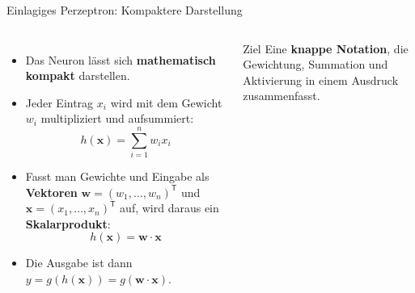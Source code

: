 \begin{frame}{Einlagiges Perzeptron: Kompaktere Darstellung}
    \small
\begin{columns}
\begin{itemize}
  \item Das Neuron lässt sich \textbf{mathematisch kompakt} darstellen.
  \item Jeder Eintrag $x_i$ wird mit dem Gewicht $w_i$ multipliziert und
        aufsummiert:
        \[
          h(\mathbf{x}) = \sum_{i=1}^{n} w_i x_i
        \]
  \item Fasst man Gewichte und Eingabe als \textbf{Vektoren}
        $\mathbf{w} = (w_1, \dots, w_n)^{\mathsf{T}}$ und
        $\mathbf{x} = (x_1, \dots, x_n)^{\mathsf{T}}$ auf, wird daraus ein
        \textbf{Skalarprodukt}:
        \[
          h(\mathbf{x}) = \mathbf{w}\cdot\mathbf{x}
        \]
  \item Die Ausgabe ist dann $y = g(h(\mathbf{x})) = g(\mathbf{w}\cdot\mathbf{x})$.
\end{itemize}

\begin{blockC1}{\small Ziel}
Eine \textbf{knappe Notation}, die Gewichtung, Summation und Aktivierung in
einem Ausdruck zusammenfasst.
\end{blockC1}
\end{columns}
\end{frame}


